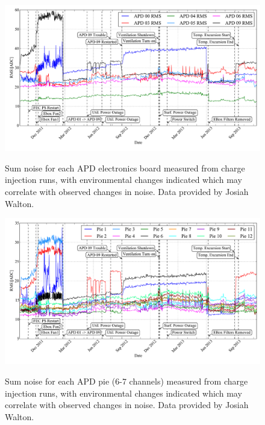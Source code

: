 \begin{figure}
\begin{center}
\includegraphics[keepaspectratio=true,width=\textwidth]{APDNoiseVsActions_boards.pdf}
\end{center}
\renewcommand{\baselinestretch}{1}
\small\normalsize
\begin{quote}
\caption{Sum noise for each APD electronics board measured from charge injection runs, with environmental changes indicated which may correlate with observed changes in noise.  Data provided by Josiah Walton.}
\label{fig:APDSumBoardNoise_JosiahEnvironmental}
\end{quote}
\end{figure}
\renewcommand{\baselinestretch}{2}
\small\normalsize

\begin{figure}
\begin{center}
\includegraphics[keepaspectratio=true,width=\textwidth]{APDNoiseVsActions_pies.pdf}
\end{center}
\renewcommand{\baselinestretch}{1}
\small\normalsize
\begin{quote}
\caption{Sum noise for each APD pie (6-7 channels) measured from charge injection runs, with environmental changes indicated which may correlate with observed changes in noise.  Data provided by Josiah Walton.}
\label{fig:APDSumPieNoise_JosiahEnvironmental}
\end{quote}
\end{figure}
\renewcommand{\baselinestretch}{2}
\small\normalsize

